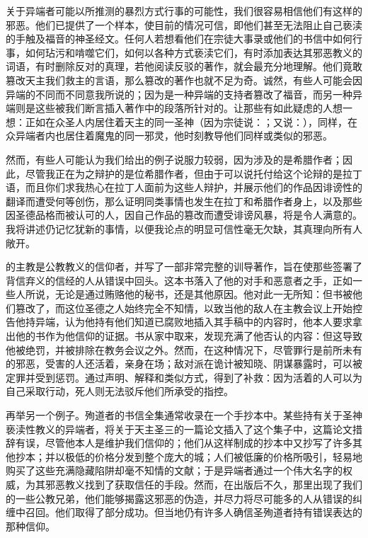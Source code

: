 关于异端者可能以所推测的暴烈方式行事的可能性，我们很容易相信他们有这样的邪恶。他们已提供了一个样本，使目前的情况可信，即他们甚至无法阻止自己亵渎的手触及福音的神圣经文。任何人若想看他们在宗徒大事录或他们的书信中如何行事，如何玷污和啃噬它们，如何以各种方式亵渎它们，有时添加表达其邪恶教义的词语，有时删除反对的真理，若他阅读反驳的著作，就会最充分地理解。他们竟敢篡改天主我们救主的言语，那么篡改的著作也就不足为奇。诚然，有些人可能会因异端的不同而不同意我所说的；因为是一种异端的支持者篡改了福音，而另一种异端则是这些被我们断言插入著作中的段落所针对的。让那些有如此疑虑的人想一想：正如在众圣人内居住着天主的同一圣神（因为宗徒说：；又说：），同样，在众异端者内也居住着魔鬼的同一邪灵，他时刻教导他们同样或类似的邪恶。\par

然而，有些人可能认为我们给出的例子说服力较弱，因为涉及的是希腊作者；因此，尽管我正在为之辩护的是位希腊作者，但由于可以说托付给这个论辩的是拉丁语，而且你们求我热心在拉丁人面前为这些人辩护，并展示他们的作品因诽谤性的翻译而遭受何等创伤，那么证明同类事情也发生在拉丁和希腊作者身上，以及那些因圣德品格而被认可的人，因自己作品的篡改而遭受诽谤风暴，将是令人满意的。我将讲述仍记忆犹新的事情，以便我论点的明显可信性毫无欠缺，其真理向所有人敞开。\par

的主教是公教教义的信仰者，并写了一部非常完整的训导著作，旨在使那些签署了背信弃义的信经的人从错误中回头。这本书落入了他的对手和恶意者之手，正如一些人所说，无论是通过贿赂他的秘书，还是其他原因。他对此一无所知：但书被他们篡改了，而这位圣德之人始终完全不知情，以致当他的敌人在主教会议上开始控告他持异端，认为他持有他们知道已腐败地插入其手稿中的内容时，他本人要求拿出他的书作为他信仰的证据。书从家中取来，发现充满了他否认的内容：但这导致他被绝罚，并被排除在教务会议之外。然而，在这种情况下，尽管罪行是前所未有的邪恶，受害的人还活着，亲身在场；敌对派在诡计被知晓、阴谋暴露时，可以被定罪并受到惩罚。通过声明、解释和类似方式，得到了补救：因为活着的人可以为自己采取行动，死人则无法驳斥他们所承受的指控。\par

再举另一个例子。殉道者的书信全集通常收录在一个手抄本中。某些持有关于圣神亵渎性教义的异端者，将关于天主圣三的一篇论文插入了这个集子中，这篇论文措辞有误，尽管他本人是维护我们信仰的；他们从这样制成的抄本中又抄写了许多其他抄本；并以极低的价格分发到整个庞大的城；人们被低廉的价格所吸引，轻易地购买了这些充满隐藏陷阱却毫不知情的文献；于是异端者通过一个伟大名字的权威，为其邪恶教义找到了获取信任的手段。然而，在出版后不久，那里出现了我们的一些公教兄弟，他们能够揭露这邪恶的伪造，并尽力将尽可能多的人从错误的纠缠中召回。他们取得了部分成功。但当地仍有许多人确信圣殉道者持有错误表达的那种信仰。\par

